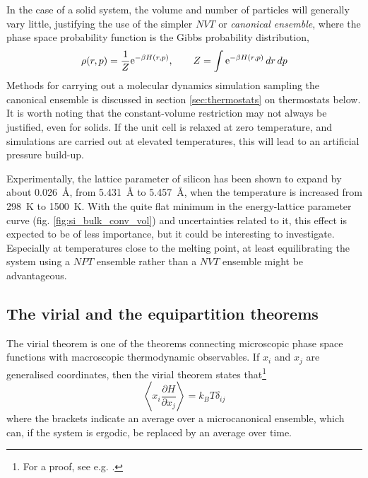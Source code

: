 \documentclass[11pt,bibliography=totoc,index=totoc]{scrbook}   %
\begin{document}
In the case of a solid system, the volume and number of particles will generally vary little, 
justifying the use of the simpler $NVT$ or \emph{canonical ensemble}, where the phase space probability function
is the Gibbs probability distribution,
\begin{equation}
  \rho(r,p) = \frac{1}{Z} \mathrm{e}^{-\beta H(r,p)},\qquad Z = \int \mathrm{e}^{-\beta H(r,p)} \,dr\,dp
  \label{eq:gibbs}
\end{equation}
Methods for carrying out a molecular dynamics simulation sampling the canonical ensemble is discussed in 
section \ref{sec:thermostats} on thermostats below.
It is worth noting that the constant-volume restriction may not always be justified, even for solids.
If the unit cell is relaxed at zero temperature, and simulations are carried out at elevated temperatures,
this will lead to an artificial pressure build-up.

Experimentally, the lattice parameter of silicon has been shown to expand by about 0.026~Å, from 5.431~Å to 5.457~Å, when the temperature is increased from 298~K to 1500~K.\cite{Okada:1984}
With the quite flat minimum in the energy-lattice parameter curve (fig. \ref{fig:si_bulk_conv_vol}) and uncertainties related to it, 
this effect is expected to be of less importance, but it could be interesting to investigate.
Especially at temperatures close to the melting point, at least equilibrating the system using a $NPT$ ensemble rather than a $NVT$ ensemble might be advantageous.

%
\subsection{The virial and the equipartition theorems}
%

The virial theorem is one of the theorems connecting microscopic phase space functions with macroscopic thermodynamic observables. 
If $x_i$ and $x_j$ are generalised coordinates,
then the virial theorem states that\footnote{For a proof, see e.g. \cite[81]{Tuckerman:2010}.}
\begin{equation}
  \left\langle x_i \frac{\partial H}{\partial x_j}\right\rangle = k_BT \delta_{ij}
\end{equation}
where the brackets indicate an average over a microcanonical ensemble, which can, if the system is ergodic, be replaced by an average over time.
\end{document}
